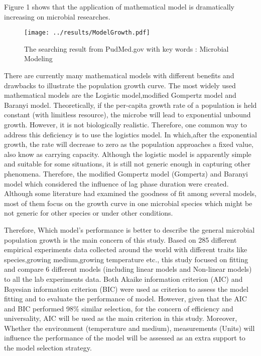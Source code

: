 \documentclass[11pt]{article}
\begin{document}
  Figure 1 shows that the application of mathematical model is dramatically increasing on microbial researches.
  \begin{figure}[H]
    \centering
    \texttt{[image: ../results/ModelGrowth.pdf]}
    \caption{The searching result from PudMed.gov with key words : Microbial Modeling}
  \end{figure}
  There are currently many mathematical models with different benefits and drawbacks to illustrate the population growth curve\cite{baranyi_modeling_1993}. The most widely used mathematical models are the Logistic model\cite{zwietering_modeling_1990},modified Gompertz model\cite{zwietering_modeling_1990} and Baranyi model\cite{baranyi_modeling_1993}. Theoretically, if the per-capita growth rate of a population is held constant (with limitless resource), the microbe will lead to exponential unbound growth. However, it is not biologically realistic. Therefore, one common way to address this deficiency is to use the logistics model. In which,after the exponential growth, the rate will decrease to zero as the population approaches a fixed value, also know as carrying capacity. Although the logistic model is apparently simple and suitable for some situations, it is still not generic enough in capturing other phenomena. Therefore, the modified Gompertz model (Gompertz)\cite{zwietering_modeling_1990} and Baranyi model \cite{baranyi_modeling_1993} which considered the influence of lag phase duration were created. Although some literature had examined the goodness of fit among several models\cite{xiong_comparison_1999,buchanan_when_1997}, most of them focus on the growth curve in one microbial species which might be not generic for other species or under other conditions.
 
  Therefore, Which model's performance is better to describe the general microbial population growth is the main concern of this study. Based on 285 different empirical experiments data collected around the world with different traits like species,growing medium,growing temperature etc., this study focused on fitting and compare 6 different models (including linear models and Non-linear models) to all the lab experiments data. Both Akaike information criterion (AIC)  and Bayesian information criterion (BIC) \cite{kuha_aic_2004} were used as criterion to assess the model fitting and to evaluate the performance of model. However, given that the AIC and BIC performed 98\% similar selection, for the concern of efficiency and universality, AIC will be used as the main criterion in this study. Moreover, Whether the environment (temperature and medium), measurements (Units) will influence the performance of the model will be assessed as an extra support to the model selection strategy.
  
\end{document}
